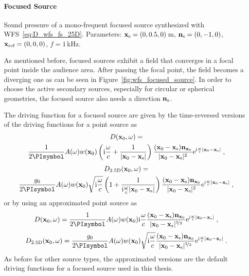 \paragraph{Focused Source}
%
%
\begin{marginfigure}
    \centering
    \ft
    
    \caption{Sound pressure of a mono-frequent focused source synthesized with
        \twohalfD \ac{WFS}~\eqref{eq:D_wfs_fs_25D}. Parameters: $\mathbf{x}_\text{s} = (0,0.5,0)$\,m,
        $\mathbf{n}_\text{s} = (0,-1,0)$, $\mathbf{x}_\text{ref} = (0,0,0)$, $f = 1$\,kHz.
        }
    \label{fig:wfs_focused_source}
\end{marginfigure}
%
As mentioned before, focused sources exhibit a field that converges in a focal
point inside the audience area. After passing the focal
point, the field becomes a diverging one as can be seen in
Figure~\ref{fig:wfs_focused_source}. In order to choose the active secondary
sources, especially for circular or spherical geometries, the focused source
also needs a direction $\mathbf{n}_\text{s}$.

The driving function for a focused source are given by the time-reversed
versions of the driving functions for a point source as
%
\begin{multline}
    D(\x_0,\omega) = \\
    \frac{1}{2\PI} A(\omega) w(\x_0) \left(\I\omegac +
    \frac{1}{|\x_0-\xs|} \right) \frac{(\x_0-\xs)\n_{\x_0}}{|\x_0-\xs|^2}
    \E^{\I\omegac |\x_0-\xs|} \qc
    \label{eq:D_wfs_fs_without_approximation}
\end{multline}
%
\begin{multline}
    D_\twohalfD(\x_0,\omega) = \\
    \frac{g_0}{2\PI} A(\omega) w(\x_0) \sqrt{\I\omegac} \left(
    1 + \frac{1}{\I\omegac|\x_0-\xs|}
    \right) \frac{(\x_0-\xs) \n_{\x_0}}{|\x_0-\xs|^2} \E^{\I\omegac |\x_0-\xs|}
    \qc
    \label{eq:D_wfs_fs_25D_without_approximation}
\end{multline}
%
or by using an approximated point source as
%
\begin{equation}
    D(\x_0,\omega) = \frac{1}{2\PI} A(\omega) w(\x_0) \I\omegac
    \frac{(\x_0-\xs)\n_{\x_0}}{|\x_0-\xs|^{\nicefrac{3}{2}}}
    \E^{\I\omegac |\x_0-\xs|} \qc
    \label{eq:D_wfs_fs}
\end{equation}
%
\begin{equation}
    D_\twohalfD(\x_0,\omega) = \frac{g_0}{2\PI} A(\omega) w(\x_0) \sqrt{\I\omegac}
    \frac{(\x_0-\xs)\n_{\x_0}}{|\x_0-\xs|^{\nicefrac{3}{2}}}
    \E^{\I\omegac |\x_0-\xs|} \qp
    \label{eq:D_wfs_fs_25D}
\end{equation}
%
As before for other source types, the approximated versions are the default driving functions for a focused
source used in this thesis.

